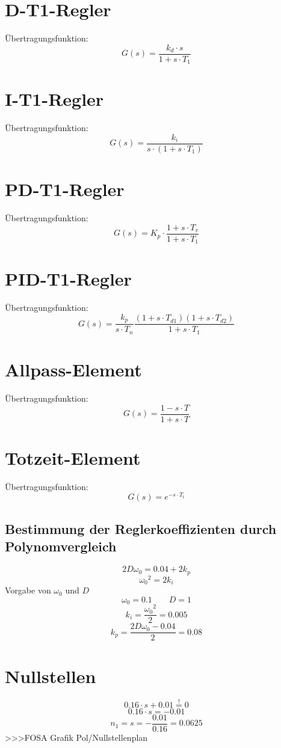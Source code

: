 \section{D-T1-Regler}
Übertragungsfunktion:
\[ G(s) = \frac{k_d \cdot s}{1 + s \cdot T_1} \]

\section{I-T1-Regler}
Übertragungsfunktion:
\[ G(s) = \frac{k_i}{s \cdot (1 + s \cdot T_1)} \]

\section{PD-T1-Regler}
Übertragungsfunktion:
\[ G(s) = K_p \cdot \frac{1 + s \cdot T_v}{1 + s \cdot T_1} \]

\section{PID-T1-Regler}
Übertragungsfunktion:
\[ G(s) = \frac{k_p}{s \cdot T_n} \frac{(1 + s \cdot T_{d1})(1 + s \cdot T_{d2}) } {1 + s \cdot T_1 } \]

\section{Allpass-Element}
Übertragungsfunktion:
\[ G(s) = \frac{1 - s \cdot T}{1 + s \cdot T} \]

\section{Totzeit-Element}
Übertragungsfunktion:
\[ G(s) = e^{- s \cdot T_t}\]

\subsection{Bestimmung der Reglerkoeffizienten durch Polynomvergleich}
\[ 2 D \omega_0 = 0.04 + 2 k_p \]
\[ {\omega_0}^2 = 2 k_i \]
Vorgabe von $\omega_0$ und $D$
\[ \omega_0 = 0.1 \qquad D = 1 \]
\[ k_i = \frac{{\omega_0}^2}{2} = 0.005 \]
\[ k_p = \frac{2 D \omega_0 - 0.04}{2} = 0.08 \]

\section{Nullstellen}
\[ 0.16 \cdot s + 0.01 \stackrel{!}{=} 0 \]
\[ 0.16 \cdot s = -0.01 \]
\[ n_1 = s = -\frac{0.01}{0.16} = 0.0625 \]
>>>FOSA Grafik Pol/Nullstellenplan

